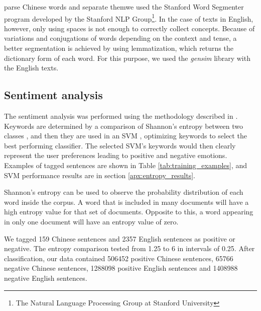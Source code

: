 \DIFdelbegin {}\DIFdelend \DIFaddbegin {}\DIFaddend parse Chinese words and separate them\DIFaddbegin \DIFadd{, }\DIFaddend we used the Stanford Word Segmenter \cite[][]{chang2008} program developed by the Stanford NLP Group\footnote{\label{stanfordnlp}The Natural Language Processing Group at Stanford University}. In the case of texts in English, however, only using spaces is not enough to correctly collect concepts. Because of variations and conjugations of words depending on the context and tense, a better segmentation is achieved by using lemmatization, which returns the dictionary form of each word. For this purpose, we used the \textit{gensim} library with the English texts.

\subsection{Sentiment analysis}\label{sentimentanalysis}

The sentiment analysis was performed using the methodology described in \cite{Aleman2018ICAROB}. Keywords are determined by a comparison of Shannon's entropy \cite[][]{shannon1948} between two classes \DIFaddbegin {}\DIFaddend , and then they are used in an SVM \cite[][]{cortes1995}, optimizing keywords to select the best performing classifier. The selected SVM's keywords would then clearly represent the user preferences leading to positive and negative emotions. Examples of tagged sentences are shown in Table \ref{tab:training_examples}, and SVM performance results are \DIFdelbegin {}\DIFdelend \DIFaddbegin {}\DIFaddend in section \ref{apx:entropy_results}.

Shannon’s entropy can be used to observe the probability distribution of each word inside the corpus. A word that is included in many documents will have a high entropy value for that set of documents. Opposite to this, a word appearing in only one document will have an entropy value of zero. 

We tagged 159 Chinese sentences and \num[group-separator={,}]{2357} English sentences as positive or negative. The entropy comparison \DIFdelbegin {}\DIFdelend \DIFaddbegin {}\DIFaddend tested from 1.25 to 6 in intervals of 0.25. After classification, our data contained \num[group-separator={,}]{506452} positive Chinese sentences, \num[group-separator={,}]{65766} negative Chinese sentences, \num[group-separator={,}]{1288098} positive English sentences and \num[group-separator={,}]{1408988} negative English sentences. 

